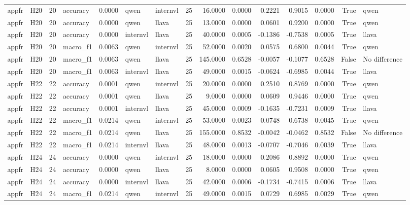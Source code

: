 \begin{table}[tbp]
\begin{tabular}{llrlrllrrrrrrrl}
appfr & H20 & 20 & accuracy & 0.0000 & qwen & internvl & 25 & 16.0000 & 0.0000 & 0.2221 & 0.9015 & 0.0000 & True & qwen \\
appfr & H20 & 20 & accuracy & 0.0000 & qwen & llava & 25 & 13.0000 & 0.0000 & 0.0601 & 0.9200 & 0.0000 & True & qwen \\
appfr & H20 & 20 & accuracy & 0.0000 & internvl & llava & 25 & 40.0000 & 0.0005 & -0.1386 & -0.7538 & 0.0005 & True & llava \\
appfr & H20 & 20 & macro\_f1 & 0.0063 & qwen & internvl & 25 & 52.0000 & 0.0020 & 0.0575 & 0.6800 & 0.0044 & True & qwen \\
appfr & H20 & 20 & macro\_f1 & 0.0063 & qwen & llava & 25 & 145.0000 & 0.6528 & -0.0057 & -0.1077 & 0.6528 & False & No difference \\
appfr & H20 & 20 & macro\_f1 & 0.0063 & internvl & llava & 25 & 49.0000 & 0.0015 & -0.0624 & -0.6985 & 0.0044 & True & llava \\
appfr & H22 & 22 & accuracy & 0.0001 & qwen & internvl & 25 & 20.0000 & 0.0000 & 0.2510 & 0.8769 & 0.0000 & True & qwen \\
appfr & H22 & 22 & accuracy & 0.0001 & qwen & llava & 25 & 9.0000 & 0.0000 & 0.0609 & 0.9446 & 0.0000 & True & qwen \\
appfr & H22 & 22 & accuracy & 0.0001 & internvl & llava & 25 & 45.0000 & 0.0009 & -0.1635 & -0.7231 & 0.0009 & True & llava \\
appfr & H22 & 22 & macro\_f1 & 0.0214 & qwen & internvl & 25 & 53.0000 & 0.0023 & 0.0748 & 0.6738 & 0.0045 & True & qwen \\
appfr & H22 & 22 & macro\_f1 & 0.0214 & qwen & llava & 25 & 155.0000 & 0.8532 & -0.0042 & -0.0462 & 0.8532 & False & No difference \\
appfr & H22 & 22 & macro\_f1 & 0.0214 & internvl & llava & 25 & 48.0000 & 0.0013 & -0.0707 & -0.7046 & 0.0039 & True & llava \\
appfr & H24 & 24 & accuracy & 0.0000 & qwen & internvl & 25 & 18.0000 & 0.0000 & 0.2086 & 0.8892 & 0.0000 & True & qwen \\
appfr & H24 & 24 & accuracy & 0.0000 & qwen & llava & 25 & 8.0000 & 0.0000 & 0.0605 & 0.9508 & 0.0000 & True & qwen \\
appfr & H24 & 24 & accuracy & 0.0000 & internvl & llava & 25 & 42.0000 & 0.0006 & -0.1734 & -0.7415 & 0.0006 & True & llava \\
appfr & H24 & 24 & macro\_f1 & 0.0214 & qwen & internvl & 25 & 49.0000 & 0.0015 & 0.0729 & 0.6985 & 0.0029 & True & qwen \\

\end{tabular}
\end{table}
